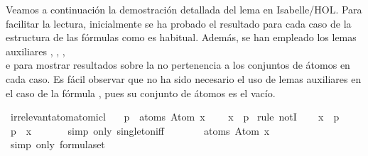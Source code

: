 \begin{isabellebody}
\begin{isamarkuptext}
  Veamos a continuación la demostración detallada del lema en
  Isabelle/HOL. Para facilitar la lectura, inicialmente se ha
  probado el resultado para cada caso de la estructura de las fórmulas
  como es habitual. Además, se han empleado los lemas auxiliares 
  , ,
  ,\\  e 
   para mostrar resultados sobre la no
  pertenencia a los conjuntos de átomos en cada caso. Es fácil observar 
  que no ha sido necesario el uso de lemas auxiliares en el caso de la 
  fórmula \isa{{\isasymbottom}}, pues su conjunto de átomos es el vacío.%
\end{isamarkuptext}\isamarkuptrue%
\isamarkupfalse%
\ irrelevant{\isacharunderscore}atom{\isacharunderscore}atomic{\isacharunderscore}l{}{\isacharcolon}\isanewline
\ \ \ {\isachardoublequoteopen}p\ {\isasymnotin}\ atoms\ {\isacharparenleft}Atom\ x{\isacharparenright}{\isachardoublequoteclose}\ \isanewline
\ \ \ {\isachardoublequoteopen}x\ {\isasymnoteq}\ p{\isachardoublequoteclose}\isanewline
%
\isadelimproof
%
\endisadelimproof
%
\isatagproof
{}\isamarkupfalse%
\ {\isacharparenleft}rule\ notI{\isacharparenright}\isanewline
\ \ \isamarkupfalse%
\ {\isachardoublequoteopen}x\ {\isacharequal}\ p{\isachardoublequoteclose}\isanewline
\ \ \isamarkupfalse%
\ \isamarkupfalse%
\ {\isachardoublequoteopen}p\ {\isasymin}\ {\isacharbraceleft}x{\isacharbraceright}{\isachardoublequoteclose}\ \isanewline
\ \ \ \ \isamarkupfalse%
\ {\isacharparenleft}simp\ only{\isacharcolon}\ singleton{\isacharunderscore}iff{\isacharparenright}\isanewline
\ \ \isamarkupfalse%
\ \isamarkupfalse%
\ {\isachardoublequoteopen}{\isasymdots}\ {\isacharequal}\ atoms\ {\isacharparenleft}Atom\ x{\isacharparenright}{\isachardoublequoteclose}\isanewline
\ \ \ \ \isamarkupfalse%
\ {\isacharparenleft}simp\ only{\isacharcolon}\ formula{\isachardot}set{\isacharparenleft}{}{\isacharparenright}{\isacharparenright}\isanewline

\end{isabellebody}
